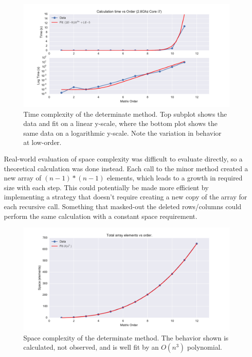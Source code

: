 \documentclass[a4paper,12pt]{article}
\begin{document}
\begin{figure}[h]
    \centering
    \includegraphics[width=.9\textwidth]{time_complexity.pdf}
    \caption{Time complexity of the determinate method.  Top subplot shows the data and fit on a linear y-scale, where the bottom plot shows
    the same data on a logarithmic y-scale.  Note the variation in behavior at low-order.}
    \label{fig:mesh1}
\end{figure}

Real-world evaluation of space complexity was difficult to evaluate directly, so a theoretical calculation was done instead.  Each call to the
minor method created a new array of $(n-1) * (n-1)$ elements, which leads to a growth in required size with each step.
This could potentially be made more efficient by implementing a strategy that doesn't require creating a new copy of the array for
each recursive call.  Something that masked-out the deleted rows/columns could perform the same calculation with a constant space
requirement.

\begin{figure}[h]
    \centering
    \includegraphics[width=.9\textwidth]{space_complexity.pdf}
    \caption{Space complexity of the determinate method.  The behavior shown is calculated, not observed, and is well fit by
     an $O(n^3)$ polynomial.}
    \label{fig:mesh1}
\end{figure}
\end{document}
